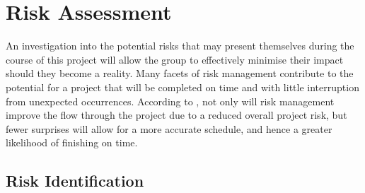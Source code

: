 \section{Risk Assessment}

An investigation into the potential risks that may present themselves during the course of this project will allow the group to effectively minimise their impact should they become a reality. Many facets of risk management contribute to the potential for a project that will be completed on time and with little interruption from unexpected occurrences. According to \citet{mcmanus03}, not only will risk management improve the flow through the project due to a reduced overall project risk, but fewer surprises will allow for a more accurate schedule, and hence a greater likelihood of finishing on time.

\subsection{Risk Identification}

